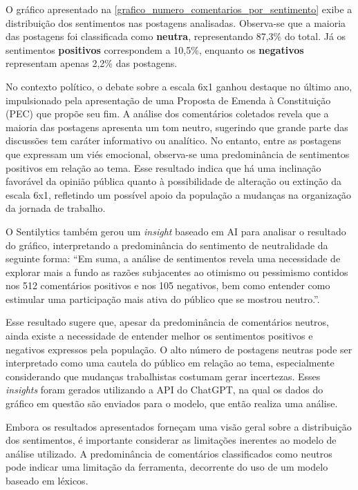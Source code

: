 \documentclass[
	12pt,				%
	oneside,			%
	a4paper,			%
	english,			%
	french,				%
	spanish,			%
	brazil				%
	]{abntex2}
\begin{document}
O gráfico apresentado na
\autoref{grafico_numero_comentarios_por_sentimento} exibe a distribuição
dos sentimentos nas postagens analisadas. Observa-se que a maioria das
postagens foi classificada como \textbf{neutra}, representando 87,3\% do
total. Já os sentimentos \textbf{positivos} correspondem a 10,5\%,
enquanto os \textbf{negativos} representam apenas 2,2\% das postagens.

No contexto político, o debate sobre a escala 6x1 ganhou destaque no
último ano, impulsionado pela apresentação de uma Proposta de Emenda à
Constituição (PEC) que propõe seu fim. A análise dos comentários
coletados revela que a maioria das postagens apresenta um tom neutro,
sugerindo que grande parte das discussões tem caráter informativo ou
analítico. No entanto, entre as postagens que expressam um viés
emocional, observa-se uma predominância de sentimentos positivos em
relação ao tema. Esse resultado indica que há uma inclinação favorável
da opinião pública quanto à possibilidade de alteração ou extinção da
escala 6x1, refletindo um possível apoio da população a mudanças na
organização da jornada de trabalho.

O Sentilytics também gerou um \emph{insight} baseado em AI para analisar
o resultado do gráfico, interpretando a predominância do sentimento de
neutralidade da seguinte forma: ``Em suma, a análise de sentimentos
revela uma necessidade de explorar mais a fundo as razões subjacentes ao
otimismo ou pessimismo contidos nos 512 comentários positivos e nos 105
negativos, bem como entender como estimular uma participação mais ativa
do público que se mostrou neutro.''.

Esse resultado sugere que, apesar da predominância de comentários
neutros, ainda existe a necessidade de entender melhor os sentimentos
positivos e negativos expressos pela população. O alto número de
postagens neutras pode ser interpretado como uma cautela do público em
relação ao tema, especialmente considerando que mudanças trabalhistas
costumam gerar incertezas. Esses \emph{insights} foram gerados
utilizando a API do ChatGPT, na qual os dados do gráfico em questão são
enviados para o modelo, que então realiza uma análise.

Embora os resultados apresentados forneçam uma visão geral sobre a
distribuição dos sentimentos, é importante considerar as limitações
inerentes ao modelo de análise utilizado. A predominância de comentários
classificados como neutros pode indicar uma limitação da ferramenta,
decorrente do uso de um modelo baseado em léxicos.
\end{document}
